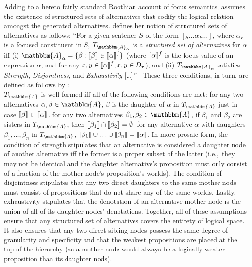 Adding to a hereto fairly standard Roothian account of focus semantics, \textcite{Ippolito2020} assumes the existence of structured sets of alternatives that codify the logical relation amongst the generated alternatives. \textcite{Ippolito2020} defines her notion of structured sets of alternatives as follows: \enquote{For a given sentence $S$ of the form $[_S\ldots\alpha_F\ldots]$, where $\alpha_F$ is a focused constituent in $S$, $T_{\mathbbm{A}_\alpha}$ is a \textit{structured set of alternatives} for $\alpha$ iff (i) $\mathbbm{A}_\alpha=\{\beta:\intension[]{$\beta$}\in\intension[f]{$\alpha$}\}$ (where $\intension[f]{$\alpha$}$ is the focus value of an expression $\alpha$, and for any $x,y\in\intension[f]{$\alpha$}, x,y\in D_\tau$), and (ii) $T_{\mathbbm{A}_\alpha}$ satisfies \textit{Strength}, \textit{Disjointness}, and \textit{Exhaustivity} [\dots].}~\parencite[p. 640]{Ippolito2020} These three conditions, in turn, are defined as follows by \textcite{Ippolito2020}:
\pex\label{def:alternativeconstruction}
\\
$T_\mathbbm{A}$ is well-formed iff all of the following conditions are met:
\a {} for any two alternatives $\alpha,\beta\in\mathbbm{A}$, $\beta$ is the daughter of $\alpha$ in $T_\mathbbm{A}$ just in case $\intension[]{$\beta$}\subset\intension[]{$\alpha$}$.
\a {} for any two alternatives $\beta_1,\beta_2\in\mathbbm{A}$, if $\beta_1$ and $\beta_2$ are sisters in $T_\mathbbm{A}$, then $\intension[]{$\beta_1$}\cap\intension[]{$\beta_2$}=\emptyset$.
\a {} for any alternative $\alpha$ with daughters $\beta_1,\ldots,\beta_n$ in $T_\mathbbm{A}$, $\intension[]{$\beta_1$}\cup\ldots\cup\intension[]{$\beta_n$}=\intension[]{$\alpha$}$.\hfill\parencite[p. 640]{Ippolito2020}
\xe
In more prosaic form, the condition of strength stipulates that an alternative is considered a daughter node of another alternative iff the former is a proper subset of the latter (i.e.,~they may not be identical and the daughter alternative's proposition must only consist of a fraction of the mother node's proposition's worlds). The condition of disjointness stipulates that any two direct daughters to the same mother node must consist of propositions that do not share any of the same worlds. Lastly, exhaustivity stipulates that the denotation of an alternative mother node is the union of all of its daughter nodes' denotations. Together, all of these assumptions ensure that any structured set of alternatives covers the entirety of logical space. It also ensures that any two direct sibling nodes possess the same degree of granularity and specificity and that the weakest propositions are placed at the top of the hierarchy (as a mother node would always be a logically weaker proposition than its daughter nods).

